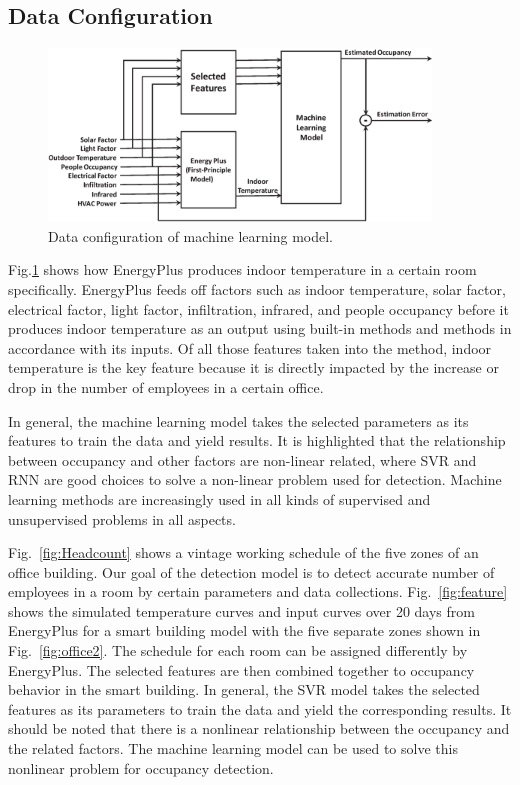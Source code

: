 \subsection{Data Configuration}
\begin{figure}[!h]
\centering
\includegraphics[width=4in]{./Pics/FlowDiagram2.eps}
\caption{Data configuration of machine learning model.}
\label{fig:SVRFlow}
\end{figure}

Fig.\ref{fig:SVRFlow} shows how EnergyPlus produces indoor temperature
in a certain room specifically. EnergyPlus feeds off factors such as
indoor temperature, solar factor, electrical factor, light factor,
infiltration, infrared, and people occupancy before it produces indoor
temperature as an output using built-in methods and methods in
accordance with its inputs. Of all those features taken into the
method, indoor temperature is the key feature because it is directly
impacted by the increase or drop in the number of employees in a
certain office.

In general, the machine learning model takes the selected parameters
as its features to train the data and yield results. It is highlighted
that the relationship between occupancy and other factors are
non-linear related, where SVR and RNN are good choices to
solve a non-linear problem used for detection. Machine learning methods are
increasingly used in all kinds of supervised and unsupervised problems
in all aspects.

Fig.~\ref{fig:Headcount} shows a vintage working schedule of the five
zones of an office building. Our goal of the detection model is to
detect accurate number of employees in a room by certain parameters
and data collections. Fig.~\ref{fig:feature} shows the simulated
temperature curves and input curves over 20 days from EnergyPlus for a
smart building model with the five separate zones shown in
Fig.~\ref{fig:office2}. The schedule for each room can be assigned
differently by EnergyPlus. The selected features are then combined
together to occupancy behavior in the smart building. In general, the
SVR model takes the selected features as its parameters to train the
data and yield the corresponding results. It should be noted that
there is a nonlinear relationship between the occupancy and the
related factors. The machine learning model can be used to solve this
nonlinear problem for occupancy detection.

